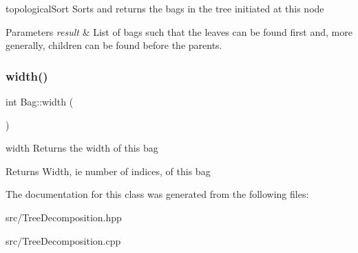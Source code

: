 topological\+Sort Sorts and returns the bags in the tree initiated at this node 


\begin{DoxyParams}{Parameters}
{\em result} & List of bags such that the leaves can be found first and, more generally, children can be found before the parents. \\
\hline
\end{DoxyParams}
\mbox{\label{class_bag_a4f6d2ad2b6a5e8f23520b2cda13f32ee}} 
\subsubsection{\texorpdfstring{width()}{width()}}
{\footnotesize\ttfamily int Bag\+::width (\begin{DoxyParamCaption}{ }\end{DoxyParamCaption})}



width Returns the width of this bag 

\begin{DoxyReturn}{Returns}
Width, ie number of indices, of this bag 
\end{DoxyReturn}


The documentation for this class was generated from the following files\+:\begin{DoxyCompactItemize}
\item 
src/Tree\+Decomposition.\+hpp\item 
src/Tree\+Decomposition.\+cpp\end{DoxyCompactItemize}
